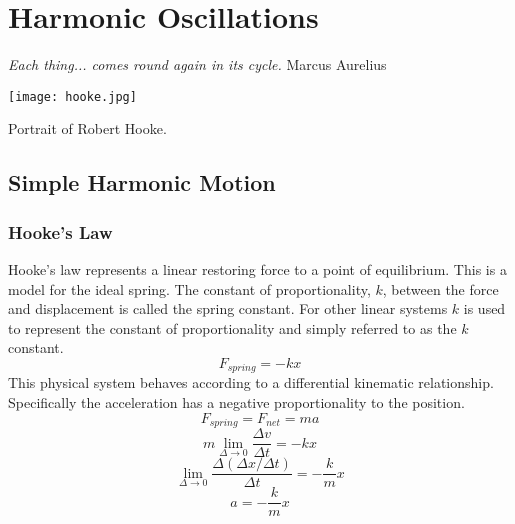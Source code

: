 \chapter{Harmonic Oscillations}

\textit{Each thing... comes round again in its cycle.}
Marcus Aurelius

\begin{marginfigure}%
  \texttt{[image: hooke.jpg]}
  \caption{Portrait of Robert Hooke.}
  \label{fig:marginfig}
\end{marginfigure}


\section{Simple Harmonic Motion}
\subsection{Hooke's Law}

Hooke's law represents a linear restoring force to a point of equilibrium.  This is a model for the ideal spring.  The constant of proportionality, $k$, between the force and displacement is called the spring constant.  For other linear systems $k$ is used to represent the constant of proportionality and simply referred to as the $k$ constant.
$$F_{spring}=-kx$$
This physical system behaves according to a differential kinematic relationship.  Specifically the acceleration has a negative proportionality to the position.
$$F_{spring}=F_{net}=ma$$
$$m \lim_{\Delta \rightarrow 0} \frac{\Delta v}{\Delta t}=-kx$$
$$\lim_{\Delta \rightarrow 0} \frac{\Delta (\Delta x / \Delta t)}{\Delta t}=-\frac{k}{m}x$$
$$a=-\frac{k}{m}x$$

